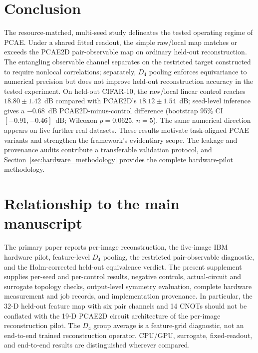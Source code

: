 \documentclass[11pt]{article}
\begin{document}
\section{Conclusion}
The resource-matched, multi-seed study delineates the tested operating regime of PCAE. Under a shared fitted readout, the simple raw/local map matches or exceeds the PCAE2D pair-observable map on ordinary held-out reconstruction. The entangling observable channel separates on the restricted target constructed to require nonlocal correlations; separately, $D_4$ pooling enforces equivariance to numerical precision but does not improve held-out reconstruction accuracy in the tested experiment. On held-out CIFAR-10, the raw/local linear control reaches $18.80\pm1.42$~dB compared with PCAE2D's $18.12\pm1.54$~dB; seed-level inference gives a $-0.68$~dB PCAE2D-minus-control difference (bootstrap 95\% CI $[-0.91,-0.46]$~dB; Wilcoxon $p=0.0625$, $n=5$). The same numerical direction appears on five further real datasets. These results motivate task-aligned PCAE variants and strengthen the framework's evidentiary scope. The leakage and provenance audits contribute a transferable validation protocol, and Section~\ref{sec:hardware_methodology} provides the complete hardware-pilot methodology.

\section*{Relationship to the main manuscript}
The primary paper reports per-image reconstruction, the five-image IBM hardware pilot, feature-level $D_4$ pooling, the restricted pair-observable diagnostic, and the Holm-corrected held-out equivalence verdict. The present supplement supplies per-seed and per-control results, negative controls, actual-circuit and surrogate topology checks, output-level symmetry evaluation, complete hardware measurement and job records, and implementation provenance. In particular, the 32-D held-out feature map with six pair channels and 14 CNOTs should not be conflated with the 19-D PCAE2D circuit architecture of the per-image reconstruction pilot. The $D_4$ group average is a feature-grid diagnostic, not an end-to-end trained reconstruction operator. CPU/GPU, surrogate, fixed-readout, and end-to-end results are distinguished wherever compared.
\end{document}
